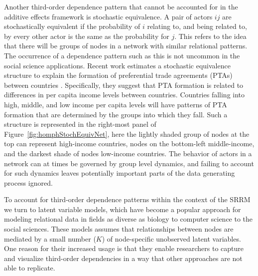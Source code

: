 \documentclass[12pt,twocolumn,twoside]{pnas-new}
\begin{document}
Another third-order dependence pattern that cannot be accounted for in the additive effects framework is stochastic equivalence. A pair of actors $ij$ are stochastically equivalent if the probability of $i$ relating to, and being related to, by every other actor is the same as the probability for $j$. This refers to the idea that there will be groups of nodes in a network with similar relational patterns. The occurrence of a dependence pattern such as this is not uncommon in the social science applications. Recent work estimates a stochastic equivalence structure to explain the formation of preferential trade agreements (PTAs) between countries \cite{manger:etal:2012}. Specifically, they suggest that PTA formation is related to differences in per capita income levels between countries. Countries falling into high, middle, and low income per capita levels will have patterns of PTA formation that are determined by the groups into which they fall. Such a structure is represented in the right-most panel of Figure~\ref{fig:homphStochEquivNet}, here the lightly shaded group of nodes at the top can represent high-income countries, nodes on the bottom-left middle-income, and the darkest shade of nodes low-income countries. The behavior of actors in a network can at times be governed by group level dynamics, and failing to account for such dynamics leaves potentially important parts of the data generating process ignored.

To account for third-order dependence patterns within the context of the SRRM we turn to latent variable models, which have become a popular approach for modeling relational data in fields as diverse as biology to computer science to the social sciences. These models assumes that relationships between nodes are mediated by a small number ($K$) of node-specific unobserved latent variables. One reason for their increased usage is that they enable researchers to capture and visualize third-order dependencies in a way that other approaches are not able to replicate. %
\end{document}
